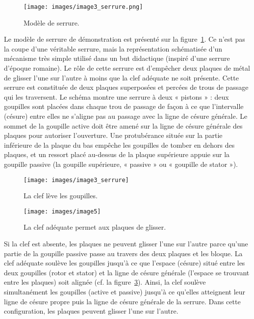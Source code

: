 \documentclass[a4paper,french,11pt,twoside]{report}
\begin{document}
\begin{figure}[ht]
  \begin{center}
    \texttt{[image: images/image3\_serrure.png]}
    \caption{Modèle de serrure.\label{modele_serrure}}
  \end{center}
\end{figure}


Le modèle de serrure de démonstration est présenté sur la figure~\ref{modele_serrure}. Ce n'est pas la coupe d'une véritable serrure, mais la représentation schématisée d'un mécanisme très simple utilisé dans un but didactique (inspiré d'une serrure d'époque romaine). Le rôle de cette serrure est d'empêcher deux plaques de métal de glisser l'une sur l'autre à moins que la clef adéquate ne soit présente. Cette serrure est constituée de deux plaques superposées et percées de trous de passage qui les traversent. Le schéma montre une serrure à deux « pistons » : deux goupilles sont placées dans chaque trou de passage de façon à ce que l'intervalle (césure) entre elles ne s'aligne pas au passage avec la ligne de césure générale. Le sommet de la goupille active doit être amené sur la ligne de césure générale des plaques pour autoriser l'ouverture. Une protubérance située sur la partie inférieure de la plaque du bas empêche les goupilles de tomber en dehors des plaques, et un ressort placé au-dessus de la plaque supérieure appuie sur la goupille passive (la goupille supérieure, « passive » ou « goupille de stator »).

\begin{figure}[ht]
  \begin{center}
    \texttt{[image: images/image3\_serrure]}
    \caption{La clef lève les goupilles.\label{clef_leve_goupilles}}
  \end{center}
\end{figure}

\begin{figure}[ht]
  \begin{center}
    \texttt{[image: images/image5]}
    \caption{La clef adéquate permet aux plaques de glisser.\label{clef_plaques}}
  \end{center}
\end{figure}

Si la clef est absente, les plaques ne peuvent glisser l'une sur l'autre parce qu'une partie de la goupille passive passe au travers des deux plaques et les bloque. La clef adéquate soulève les goupilles jusqu'à ce que l'espace (césure) situé entre les deux goupilles (rotor et stator) et la ligne de césure générale (l'espace se trouvant entre les plaques) soit alignée (cf. la figure~\ref{clef_plaques}). Ainsi, la clef soulève simultanément les goupilles (active et passive) jusqu'à ce qu'elles atteignent leur ligne de césure propre puis la ligne de césure générale de la serrure. Dans cette configuration, les plaques peuvent glisser l'une sur l'autre.
\end{document}
